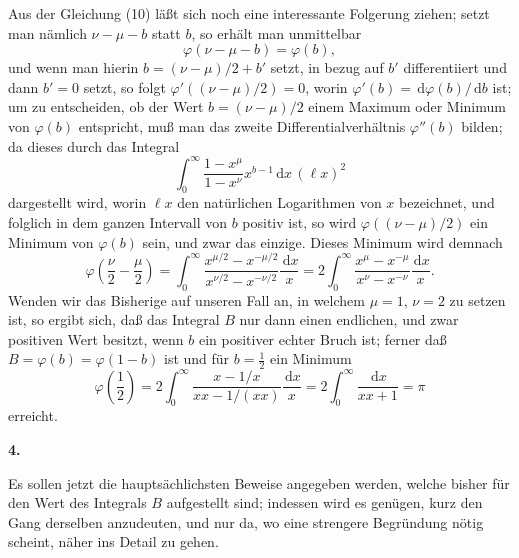 \documentclass[11pt]{article}
\newcommand{\dd}{\,\mathrm d}
\newcommand{\art}[1]{\bigskip\begin{center}\large\bfseries #1.\end{center}\nopagebreak}
\begin{document}
Aus der Gleichung (10) läßt sich noch eine interessante Folgerung ziehen; setzt man nämlich $\nu-\mu-b$ statt $b$, so erhält man unmittelbar
\begin{equation}
\varphi(\nu-\mu-b)=\varphi(b),
\tag{11}
\end{equation}
und wenn man hierin $b=(\nu-\mu)/2+b'$ setzt, in bezug auf $b'$ differentiiert und dann $b'=0$ setzt, so folgt $\varphi'((\nu-\mu)/2)=0$, worin $\varphi'(b)=\dd\varphi(b)/\dd b$ ist; um zu entscheiden, ob der Wert $b=(\nu-\mu)/2$ einem Maximum oder Minimum von $\varphi(b)$ entspricht, muß man das zweite Differentialverhältnis $\varphi''(b)$ bilden; da dieses durch das Integral
\[
\int_0^\infty \frac{1-x^\mu}{1-x^\nu}x^{b-1}\dd x\,(\ell x)^2
\]
dargestellt wird, worin $\ell x$ den natürlichen Logarithmen von $x$ bezeichnet, und folglich in dem ganzen Intervall von $b$ positiv ist, so wird $\varphi((\nu-\mu)/2)$ ein Minimum von $\varphi(b)$ sein, und zwar das einzige. Dieses Minimum wird demnach
\begin{equation}
\varphi\left(\frac{\nu}{2}-\frac{\mu}{2}\right)=
\int_0^\infty \frac{x^{\mu/2}-x^{-\mu/2}}{x^{\nu/2}-x^{-\nu/2}}\frac{\dd x}{x}
=2\int_0^\infty \frac{x^\mu-x^{-\mu}}{x^\nu-x^{-\nu}}\frac{\dd x}{x}.
\tag{12}
\end{equation}
Wenden wir das Bisherige auf unseren Fall an, in welchem $\mu=1$, $\nu=2$ zu setzen ist, so ergibt sich, daß das Integral $B$ nur dann einen endlichen, und zwar positiven Wert besitzt, wenn $b$ ein positiver echter Bruch ist; ferner daß $B=\varphi(b)=\varphi(1-b)$ ist und für $b=\tfrac12$ ein Minimum
\begin{equation}
\varphi\left(\frac12\right)=2\int_0^\infty \frac{x-1/x}{xx-1/(xx)}\frac{\dd x}{x}
=2\int_0^\infty \frac{\dd x}{xx+1}=\pi
\tag{13}
\end{equation}
erreicht.

\art{4}

Es sollen jetzt die hauptsächlichsten Beweise angegeben werden, welche bisher für den Wert des Integrals $B$ aufgestellt sind; indessen wird es genügen, kurz den Gang derselben anzudeuten, und nur da, wo eine strengere Begründung nötig scheint, näher ins Detail zu gehen.
\end{document}
